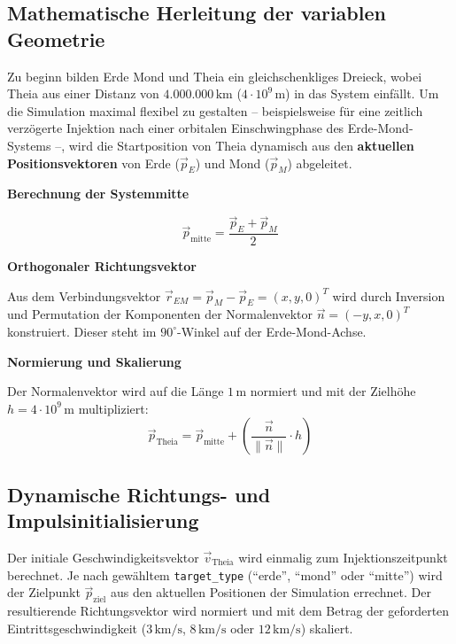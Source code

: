 \documentclass[11pt]{article}
\begin{document}
\subsection{Mathematische Herleitung der variablen
Geometrie}\label{mathematische-herleitung-der-variablen-geometrie}

Zu beginn bilden Erde Mond und Theia ein gleichschenkliges Dreieck,
wobei Theia aus einer Distanz von \(4.000.000\,\text{km}\)
(\(4 \cdot 10^9\,\text{m}\)) in das System einfällt. Um die Simulation
maximal flexibel zu gestalten -- beispielsweise für eine zeitlich
verzögerte Injektion nach einer orbitalen Einschwingphase des
Erde-Mond-Systems --, wird die Startposition von Theia dynamisch aus den
\textbf{aktuellen Positionsvektoren} von Erde (\(\vec{p}_E\)) und Mond
(\(\vec{p}_M\)) abgeleitet.

\textbf{Berechnung der Systemmitte}

\[\vec{p}_{\text{mitte}} = \frac{\vec{p}_E + \vec{p}_M}{2}\]

\textbf{Orthogonaler Richtungsvektor}

Aus dem Verbindungsvektor
\(\vec{r}_{EM} = \vec{p}_M - \vec{p}_E = (x, y, 0)^T\) wird durch
Inversion und Permutation der Komponenten der Normalenvektor
\(\vec{n} = (-y, x, 0)^T\) konstruiert. Dieser steht im
\(90^\circ\)-Winkel auf der Erde-Mond-Achse.

\textbf{Normierung und Skalierung}

Der Normalenvektor wird auf die Länge \(1\,\text{m}\) normiert und mit
der Zielhöhe \(h = 4 \cdot 10^9\,\text{m}\) multipliziert:
\[\vec{p}_{\text{Theia}} = \vec{p}_{\text{mitte}} + \left( \frac{\vec{n}}{\|\vec{n}\|} \cdot h \right)\]

\subsection{Dynamische Richtungs- und
Impulsinitialisierung}\label{dynamische-richtungs--und-impulsinitialisierung}

Der initiale Geschwindigkeitsvektor \(\vec{v}_{\text{Theia}}\) wird
einmalig zum Injektionszeitpunkt berechnet. Je nach gewähltem
\texttt{target\_type} (``erde'', ``mond'' oder ``mitte'') wird der
Zielpunkt \(\vec{p}_{\text{ziel}}\) aus den aktuellen Positionen der
Simulation errechnet. Der resultierende Richtungsvektor wird normiert
und mit dem Betrag der geforderten Eintrittsgeschwindigkeit
(\(3\,\text{km/s}\), \(8\,\text{km/s}\) oder \(12\,\text{km/s}\))
skaliert.
\end{document}
